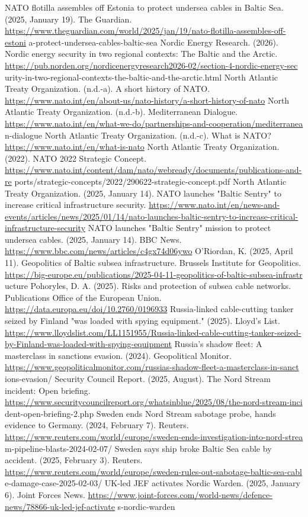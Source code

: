 \begin{referencelist}
   NATO flotilla assembles off Estonia to protect undersea cables in Baltic Sea. (2025, January 19). The Guardian. \url{https://www.theguardian.com/world/2025/jan/19/nato-flotilla-assembles-off-estoni} a-protect-undersea-cables-baltic-sea
   Nordic Energy Research. (2026). Nordic energy security in two regional contexts: The Baltic and the Arctic.
   \url{https://pub.norden.org/nordicenergyresearch2026-02/section-4-nordic-energy-sec} urity-in-two-regional-contexts-the-baltic-and-the-arctic.html North Atlantic Treaty Organization. (n.d.-a). A short history of NATO. \url{https://www.nato.int/en/about-us/nato-history/a-short-history-of-nato}
   North Atlantic Treaty Organization. (n.d.-b). Mediterranean Dialogue. \url{https://www.nato.int/en/what-we-do/partnerships-and-cooperation/mediterranea} n-dialogue
   North Atlantic Treaty Organization. (n.d.-c). What is NATO? \url{https://www.nato.int/en/what-is-nato}
   North Atlantic Treaty Organization. (2022). NATO 2022 Strategic Concept. \url{https://www.nato.int/content/dam/nato/webready/documents/publications-and-re} ports/strategic-concepts/2022/290622-strategic-concept.pdf
   North Atlantic Treaty Organization. (2025, January 14). NATO launches "Baltic Sentry" to increase critical infrastructure security. \url{https://www.nato.int/en/news-and-events/articles/news/2025/01/14/nato-launches-baltic-sentry-to-increase-critical-infrastructure-security}
   NATO launches "Baltic Sentry" mission to protect undersea cables. (2025, January 14). BBC News. \url{https://www.bbc.com/news/articles/c4gx74d06ywo}
   O'Riordan, K. (2025, April 11). Geopolitics of Baltic subsea infrastructure. Brussels Institute for Geopolitics. \url{https://big-europe.eu/publications/2025-04-11-geopolitics-of-baltic-subsea-infrastr} ucture Pohoryles, D.
   A. (2025). Risks and protection of subsea cable networks. Publications Office of the European Union. \url{https://data.europa.eu/doi/10.2760/0196933}
   Russia-linked cable-cutting tanker seized by Finland "was loaded with spying equipment." (2025). Lloyd's List. \url{https://www.lloydslist.com/LL1151955/Russia-linked-cable-cutting-tanker-seized-by-Finland-was-loaded-with-spying-equipment}
   Russia's shadow fleet: A masterclass in sanctions evasion. (2024). Geopolitical Monitor. \url{https://www.geopoliticalmonitor.com/russias-shadow-fleet-a-masterclass-in-sanct} ions-evasion/
   Security Council Report. (2025, August). The Nord Stream incident: Open briefing. \url{https://www.securitycouncilreport.org/whatsinblue/2025/08/the-nord-stream-inci} dent-open-briefing-2.php
   Sweden ends Nord Stream sabotage probe, hands evidence to Germany. (2024, February 7). Reuters. \url{https://www.reuters.com/world/europe/sweden-ends-investigation-into-nord-strea} m-pipeline-blasts-2024-02-07/
   Sweden says ship broke Baltic Sea cable by accident. (2025, February 3). Reuters. \url{https://www.reuters.com/world/europe/sweden-rules-out-sabotage-baltic-sea-cabl} e-damage-case-2025-02-03/
   UK-led JEF activates Nordic Warden. (2025, January 6). Joint Forces News. \url{https://www.joint-forces.com/world-news/defence-news/78866-uk-led-jef-activate} s-nordic-warden
\end{referencelist}

